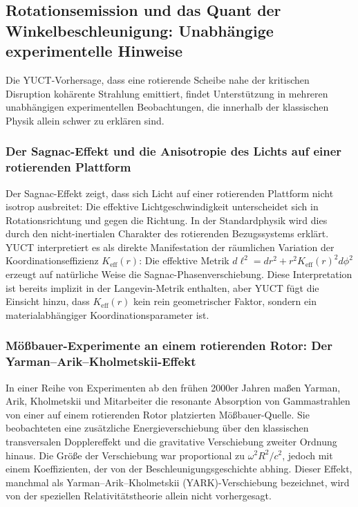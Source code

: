 \documentclass[12pt,a4paper]{article}
\begin{document}
	\subsection{Rotationsemission und das Quant der Winkelbeschleunigung: Unabhängige experimentelle Hinweise}
	
	Die YUCT-Vorhersage, dass eine rotierende Scheibe nahe der kritischen Disruption kohärente Strahlung emittiert, findet Unterstützung in mehreren unabhängigen experimentellen Beobachtungen, die innerhalb der klassischen Physik allein schwer zu erklären sind.
	
	\subsubsection{Der Sagnac-Effekt und die Anisotropie des Lichts auf einer rotierenden Plattform}
	
	Der Sagnac-Effekt zeigt, dass sich Licht auf einer rotierenden Plattform nicht isotrop ausbreitet: Die effektive Lichtgeschwindigkeit unterscheidet sich in Rotationsrichtung und gegen die Richtung. In der Standardphysik wird dies durch den nicht-inertialen Charakter des rotierenden Bezugssystems erklärt. YUCT interpretiert es als direkte Manifestation der räumlichen Variation der Koordinationseffizienz \(K_{\mathrm{eff}}(r)\): Die effektive Metrik \(d\ell^2 = dr^2 + r^2 K_{\mathrm{eff}}(r)^2 d\phi^2\) erzeugt auf natürliche Weise die Sagnac-Phasenverschiebung. Diese Interpretation ist bereits implizit in der Langevin-Metrik enthalten, aber YUCT fügt die Einsicht hinzu, dass \(K_{\mathrm{eff}}(r)\) kein rein geometrischer Faktor, sondern ein materialabhängiger Koordinationsparameter ist.
	
	\subsubsection{Mößbauer-Experimente an einem rotierenden Rotor: Der Yarman–Arik–Kholmetskii-Effekt}
	
	In einer Reihe von Experimenten ab den frühen 2000er Jahren maßen Yarman, Arik, Kholmetskii und Mitarbeiter die resonante Absorption von Gammastrahlen von einer auf einem rotierenden Rotor platzierten Mößbauer-Quelle. Sie beobachteten eine zusätzliche Energieverschiebung über den klassischen transversalen Dopplereffekt und die gravitative Verschiebung zweiter Ordnung hinaus. Die Größe der Verschiebung war proportional zu \(\omega^2 R^2 / c^2\), jedoch mit einem Koeffizienten, der von der Beschleunigungsgeschichte abhing. Dieser Effekt, manchmal als Yarman–Arik–Kholmetskii (YARK)-Verschiebung bezeichnet, wird von der speziellen Relativitätstheorie allein nicht vorhergesagt.
	
\end{document}
